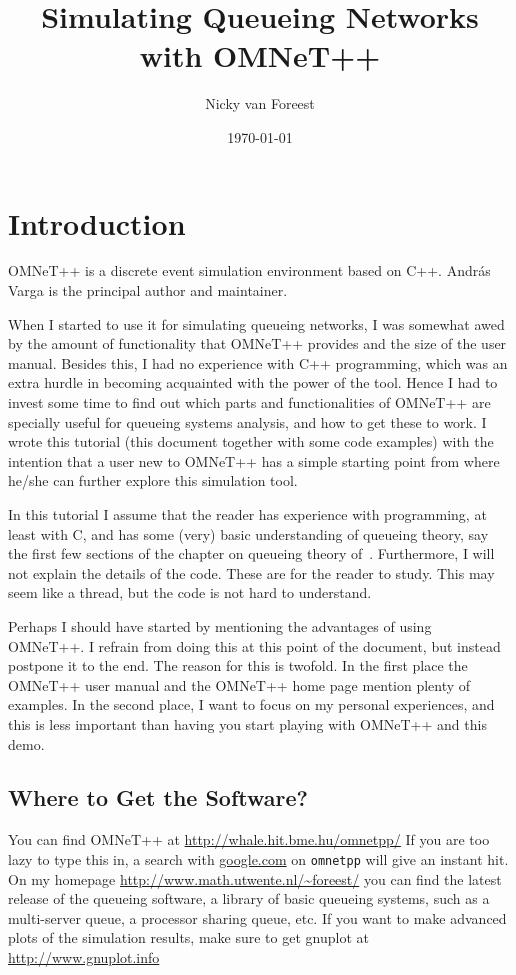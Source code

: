 \documentclass[a4paper]{article}
\date{\today}
\author{Nicky van Foreest}
\title{Simulating Queueing Networks with OMNeT++}
\begin{document}
\maketitle {}
\tableofcontents

\section{Introduction}
\label{sec:introduction}
OMNeT++ is a discrete event simulation environment based on C++. Andr{\'a}s
Varga is the principal author and maintainer.

When I started to use it for simulating queueing networks, I was
somewhat awed by the amount of functionality that OMNeT++ provides and
the size of the user manual. Besides this, I had no experience with
C++ programming, which was an extra hurdle in becoming acquainted with
the power of the tool. Hence I had to invest some time to find out
which parts and functionalities of OMNeT++ are specially useful for
queueing systems analysis, and how to get these to work. I wrote this
tutorial (this document together with some code examples) with the
intention that a  user new to OMNeT++ has a simple starting point from
where he/she can further explore this simulation tool.

In this tutorial I assume that the reader has experience with
programming, at least with C, and has some (very) basic understanding
of queueing theory, say the first few sections of the chapter on
queueing theory of~\cite{Ross93}.  Furthermore, I will not explain the
details of the code. These are for the reader to study. This may seem
like a thread, but the code is not hard to understand.

Perhaps I should have started by mentioning the advantages of using
OMNeT++. I refrain from doing this at this point of the document, but
instead postpone it to the end. The reason for this is twofold. In the
first place the OMNeT++ user manual and the OMNeT++ home page mention
plenty of examples. In the second place, I want to focus on my
personal experiences, and this is less important than having you start
playing with OMNeT++ and this demo.

\subsection{Where to Get the Software?}
\label{sec:where-get-software}
You can find OMNeT++ at \url{http://whale.hit.bme.hu/omnetpp/} If you
are too lazy to type this in, a search with \url{google.com} on
\texttt{omnetpp} will give an instant hit. On my homepage
\url{http://www.math.utwente.nl/~foreest/} you can find the latest
release of the queueing software, a library of basic queueing systems,
such as a multi-server queue, a processor sharing queue, etc.  If you
want to make advanced plots of the simulation results, make sure to
get gnuplot at \url{http://www.gnuplot.info}
\end{document}
